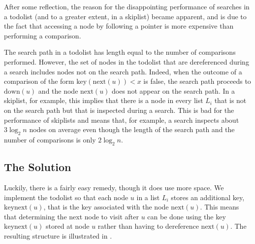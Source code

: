 \documentclass[12pt]{patmorin}
\begin{document}
After some reflection, the reason for the disappointing performance of
searches in a todolist (and to a greater extent, in a skiplist) became
apparent, and is due to the fact that accessing a node by following a
pointer is more expensive than performing a comparison.

The search path in a todolist has length equal to the number of
comparisons performed.  However, the set of nodes in the todolist
that are dereferenced during a search includes nodes not on the
search path. Indeed, when the outcome of a comparison of the form
$\mathrm{key}(\mathrm{next}(u)) < x$ is false, the search path proceeds
to $\mathrm{down}(u)$ and the node $\mathrm{next}(u)$ does not appear
on the search path.  In a skiplist,
for example, this implies that there is a node in every list $L_i$
that is not on the search path but that is inspected during a search.
This is bad for the performance of skiplists and means that, for example,
a search inspects about $3\log_2 n$ nodes on average even though the length
of the search path and the number of comparisons is only $2\log_2 n$.

\subsection{The Solution}

Luckily, there is a fairly easy remedy, though it does use more space.
We implement the todolist so that each node $u$ in a list $L_i$ stores an
additional key, $\mathrm{keynext}(u)$, that is the key associated with
the node $\mathrm{next}(u)$.  This means that determining the next node
to visit after $u$ can be done using the key $\mathrm{keynext}(u)$ stored
at node $u$ rather than having to dereference $\mathrm{next}(u)$. The
resulting structure is illustrated in .
\end{document}
